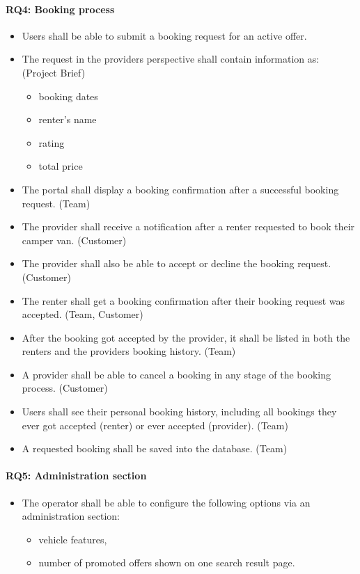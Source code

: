 \paragraph{RQ4: Booking process}
\begin{itemize}
    \item Users shall be able to submit a booking request for an active offer.
    \item The request in the providers perspective shall contain information as: (Project Brief)
        \begin{itemize}
            \item booking dates
            \item renter's name
            \item rating
            \item total price
    \end{itemize}
    \item The portal shall display a booking confirmation after a successful booking request. (Team)
    \item The provider shall receive a notification after a renter requested to book their camper van. (Customer)
    \item The provider shall also be able to accept or decline the booking request. (Customer)
    \item The renter shall get a booking confirmation after their booking request was accepted. (Team, Customer)
    \item After the booking got accepted by the provider, it shall be listed in both the renters and the providers booking history. (Team)
    \item A provider shall be able to cancel a booking in any stage of the booking process. (Customer)
    \item Users shall see their personal booking history, including all bookings they ever got accepted (renter) or ever accepted (provider).  (Team)
    \item A requested booking shall be saved into the database. (Team)
\end{itemize}

\paragraph{RQ5: Administration section}
\begin{itemize}
    \item The operator shall be able to configure the following options via an administration section:
        \begin{itemize}
            \item vehicle features,
            \item number of promoted offers shown on one search result page.
        \end{itemize}
\end{itemize}

